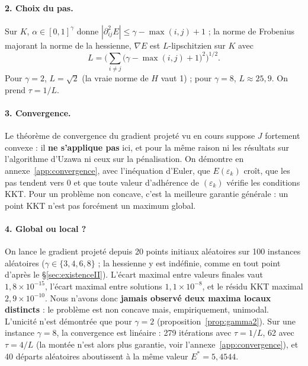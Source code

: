 \documentclass[11pt,a4paper]{article}
\theoremstyle{plain}
\theoremstyle{definition}
\begin{document}
\paragraph{2. Choix du pas.} Sur $K$, $\alpha\in[0,1]^\gamma$ donne $|\partial^2_{ij}E|\le\gamma-\max(i,j)+1$ ; la norme de Frobenius majorant la norme de la hessienne, $\nabla E$ est $L$-lipschitzien sur $K$ avec
\[L=\Big(\sum_{i\ne j}\big(\gamma-\max(i,j)+1\big)^2\Big)^{1/2}.\]
Pour $\gamma=2$, $L=\sqrt2$ (la vraie norme de $H$ vaut 1) ; pour $\gamma=8$, $L\approx25{,}9$. On prend $\tau=1/L$.

\paragraph{3. Convergence.} Le théorème de convergence du gradient projeté vu en cours suppose $J$ fortement convexe : il \textbf{ne s'applique pas} ici, et pour la même raison ni les résultats sur l'algorithme d'Uzawa ni ceux sur la pénalisation. On démontre en annexe~\ref{app:convergence}, avec l'inéquation d'Euler, que $E(\varepsilon_k)$ croît, que les pas tendent vers 0 et que toute valeur d'adhérence de $(\varepsilon_k)$ vérifie les conditions KKT. Pour un problème non concave, c'est la meilleure garantie générale : un point KKT n'est pas forcément un maximum global.

\paragraph{4. Global ou local ?} On lance le gradient projeté depuis 20 points initiaux aléatoires sur 100 instances aléatoires ($\gamma\in\{3,4,6,8\}$ ; la hessienne y est indéfinie, comme en tout point d'après le §\ref{sec:existenceII}). L'écart maximal entre valeurs finales vaut $1{,}8\times10^{-15}$, l'écart maximal entre solutions $1{,}1\times10^{-8}$, et le résidu KKT maximal $2{,}9\times10^{-10}$. Nous n'avons donc \textbf{jamais observé deux maxima locaux distincts} : le problème est non concave mais, empiriquement, unimodal. L'unicité n'est démontrée que pour $\gamma=2$ (proposition~\ref{prop:gamma2}). Sur une instance $\gamma=8$, la convergence est linéaire : 279 itérations avec $\tau=1/L$, 62 avec $\tau=4/L$ (la montée n'est alors plus garantie, voir l'annexe~\ref{app:convergence}), et 40 départs aléatoires aboutissent à la même valeur $E^*=5{,}4544$.
\end{document}
